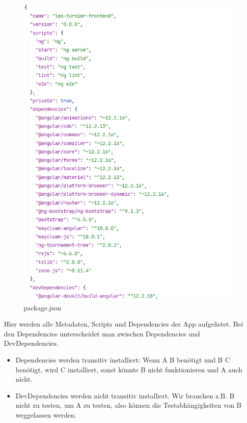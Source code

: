 \begin{figure}[H]
    \includegraphics[scale=0.6]{pics/frontend/package_json.PNG}
    \caption{package.json}
\end{figure}

Hier werden alle Metadaten, Scripts und Dependencies der App aufgelistet.
Bei den Dependencies unterscheidet man zwischen Dependencies und DevDependencies.
\begin{itemize}
    \item Dependencies werden transitiv installiert: Wenn A B benötigt und B C benötigt, wird C installiert, sonst könnte B nicht funktionieren und A auch nicht.
    \item DevDependencies werden nicht transitiv installiert. Wir brauchen z.B. B nicht zu testen, um A zu testen, also können die Testabhängigkeiten von B weggelassen werden.
\end{itemize}

